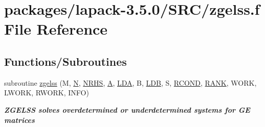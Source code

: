 \hypertarget{zgelss_8f}{}\section{packages/lapack-\/3.5.0/\+S\+R\+C/zgelss.f File Reference}
\label{zgelss_8f}
\subsection*{Functions/\+Subroutines}
\begin{DoxyCompactItemize}
\item 
subroutine \hyperlink{group__complex16GEsolve_ga61e68db68886c3f80753fac87ca35a6e}{zgelss} (M, \hyperlink{polmisc_8c_a0240ac851181b84ac374872dc5434ee4}{N}, \hyperlink{example__user_8c_aa0138da002ce2a90360df2f521eb3198}{N\+R\+H\+S}, \hyperlink{classA}{A}, \hyperlink{example__user_8c_ae946da542ce0db94dced19b2ecefd1aa}{L\+D\+A}, B, \hyperlink{example__user_8c_a50e90a7104df172b5a89a06c47fcca04}{L\+D\+B}, S, \hyperlink{superlu__enum__consts_8h_af00a42ecad444bbda75cde1b64bd7e72a9b5c151728d8512307565994c89919d5}{R\+C\+O\+N\+D}, \hyperlink{splinemodule_8c_a3a88bcc63386de30443dacede2e01847}{R\+A\+N\+K}, W\+O\+R\+K, L\+W\+O\+R\+K, R\+W\+O\+R\+K, I\+N\+F\+O)
\begin{DoxyCompactList}\small\item\em {\bfseries  Z\+G\+E\+L\+S\+S solves overdetermined or underdetermined systems for G\+E matrices} \end{DoxyCompactList}\end{DoxyCompactItemize}
